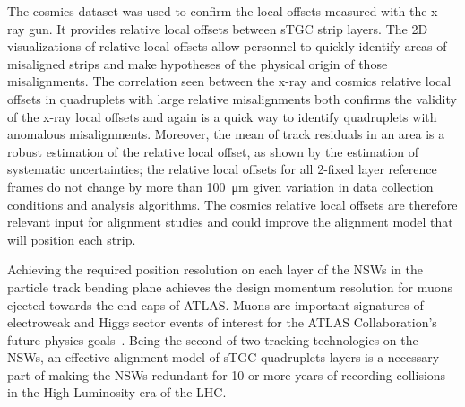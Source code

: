 The cosmics dataset was used to confirm the local offsets measured with the x-ray gun. It provides relative local offsets between sTGC strip layers. The 2D visualizations of relative local offsets allow personnel to quickly identify areas of misaligned strips and make hypotheses of the physical origin of those misalignments. The correlation seen between the x-ray and cosmics relative local offsets in quadruplets with large relative misalignments both confirms the validity of the x-ray local offsets and again is a quick way to identify quadruplets with anomalous misalignments. Moreover, the mean of track residuals in an area is a robust estimation of the relative local offset, as shown by the estimation of systematic uncertainties; the relative local offsets for all 2-fixed layer reference frames do not change by more than \SI{100}{\micro\meter} given variation in data collection conditions and analysis algorithms. The cosmics relative local offsets are therefore relevant input for alignment studies and could improve the alignment model that will position each strip. 

Achieving the required position resolution on each layer of the NSWs in the particle track bending plane achieves the design momentum resolution for muons ejected towards the end-caps of ATLAS. Muons are important signatures of electroweak and Higgs sector events of interest for the ATLAS Collaboration's future physics goals~\cite{nsw_tdr}. Being the second of two tracking technologies on the NSWs, an effective alignment model of sTGC quadruplets layers is a necessary part of making the NSWs redundant for 10 or more years of recording collisions in the High Luminosity era of the LHC. 



